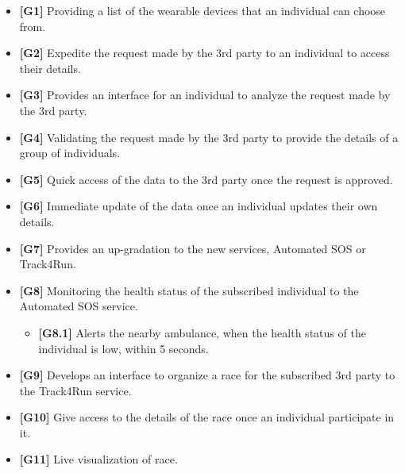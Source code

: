 \begin{itemize}
\item \textbf{[G1]} Providing a list of the wearable devices that an individual can choose from.
\item \textbf{[G2]} Expedite the request made by the 3rd party to an individual to access their details.
\item \textbf{[G3]} Provides an interface for an individual to analyze the request made by the 3rd party.
\item \textbf{[G4]} Validating the request made by the 3rd party to provide the details of a group of individuals.
\item \textbf{[G5]} Quick access of the data to the 3rd party once the request is approved.
\item \textbf{[G6]} Immediate update of the data once an individual updates their own details.
\item \textbf{[G7]} Provides an up-gradation to the new services, Automated SOS or Track4Run.
\item \textbf{[G8]} Monitoring the health status of the subscribed individual to the Automated SOS service.
\begin{itemize}
\item \textbf{[G8.1]} Alerts the nearby ambulance, when the health status of the individual is low, within 5 seconds.
\end{itemize}
\item \textbf{[G9]} Develops an interface to organize a race for the subscribed 3rd party to the Track4Run service.
\item \textbf{[G10]} Give access to the details of the race once an individual participate in it.
\item \textbf{[G11]} Live visualization of race.
\end{itemize}


